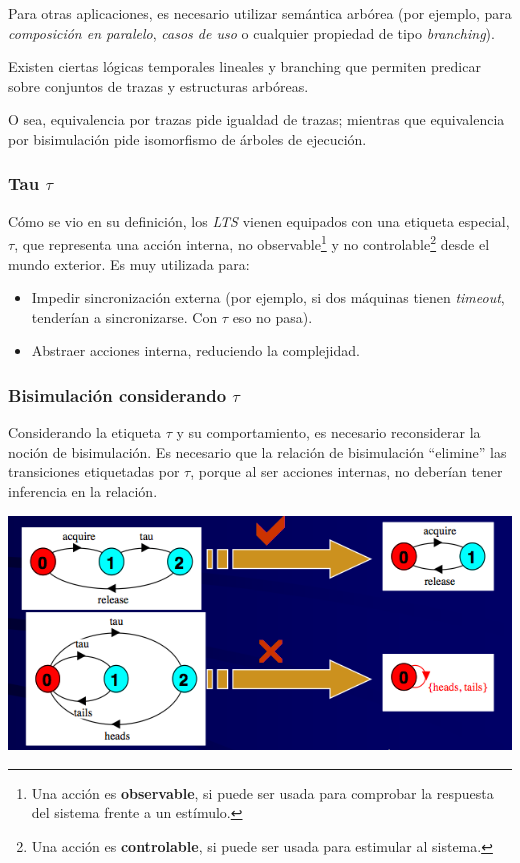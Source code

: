 \documentclass[]{article}
\begin{document}
Para otras aplicaciones, es necesario utilizar semántica arbórea (por ejemplo, para \textit{composición en paralelo}, \textit{casos de uso} o cualquier propiedad de tipo \textit{branching}).

Existen ciertas lógicas temporales lineales y branching que permiten predicar sobre conjuntos de trazas y estructuras arbóreas.

O sea, equivalencia por trazas pide igualdad de trazas; mientras que equivalencia por bisimulación pide isomorfismo de árboles de ejecución.


\subsubsection{Tau $\tau$}
Cómo se vio en su definición, los \textit{LTS} vienen equipados con una etiqueta especial, $\tau$, que representa una acción interna, no observable\footnote{Una acción es \textbf{observable}, si puede ser usada para comprobar la respuesta del sistema frente a un estímulo.} y no controlable\footnote{Una acción es \textbf{controlable}, si puede ser usada para estimular al sistema.} desde el mundo exterior. Es muy utilizada para:
\begin{itemize}
	\item Impedir sincronización externa (por ejemplo, si dos máquinas tienen \textit{timeout}, tenderían a sincronizarse. Con $\tau$ eso no pasa).
	\item Abstraer acciones interna, reduciendo la complejidad.
\end{itemize}

\subsubsection{Bisimulación considerando $\tau$}
Considerando la etiqueta $\tau$ y su comportamiento, es necesario reconsiderar la noción de bisimulación. Es necesario que la relación de bisimulación ``elimine'' las transiciones etiquetadas por $\tau$, porque al ser acciones internas, no deberían tener inferencia en la relación.

\begin{center}
	\includegraphics[scale=0.5]{BisimTau.png}
\end{center}
\end{document}
